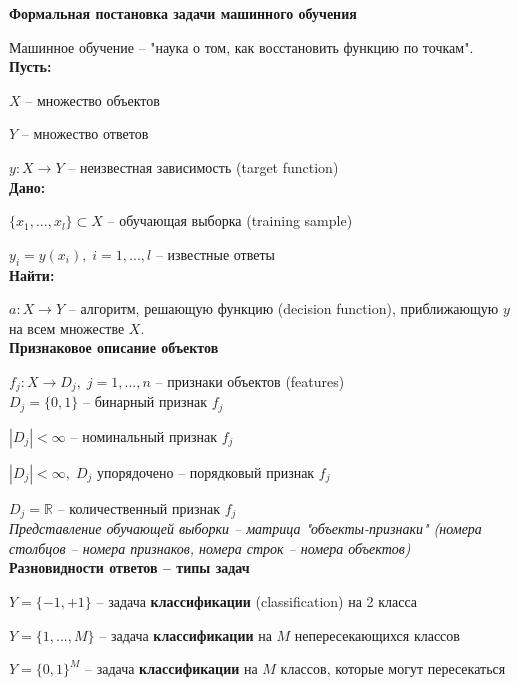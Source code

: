 \documentclass{article}
\begin{document}
    \huge{\textbf{Формальная постановка задачи машинного обучения}}\\\small
    
    Машинное обучение -- "наука о том, как восстановить функцию по точкам".\\
    
    \textbf{Пусть:}
    
    $X$ -- множество объектов
    
    $Y$ -- множество ответов
    
    $y: X\rightarrow Y$ -- неизвестная зависимость (target function)\\
    
    \textbf{Дано:}
    
    $\{x_1,...,x_l\}\subset X$ -- обучающая выборка (training sample)
    
    $y_i = y(x_i),\;i=1,...,l$ -- известные ответы\\
    
    \textbf{Найти:}
    
    $a: X\rightarrow Y$ -- алгоритм, решающую функцию (decision function), приближающую $y$ на всем множестве $X$.\\
    
    \textbf{Признаковое описание объектов}
    
    $f_j: X\rightarrow D_j,\;j=1,...,n$ -- признаки объектов (features)\\
    
    $D_j = \{0,1\}$ -- бинарный признак $f_j$
    
    $|D_j| < \infty$ -- номинальный признак $f_j$
    
    $|D_j| < \infty,\;D_j$ упорядочено -- порядковый признак $f_j$
    
    $D_j = \mathbb{R}$ -- количественный признак $f_j$\\
    
    \textit{Представление обучающей выборки -- матрица "объекты-признаки" (номера столбцов -- номера признаков, номера строк -- номера объектов)}\\

    \textbf{Разновидности ответов -- типы задач}
    
    $Y = \{-1,+1\}$ -- задача \textbf{классификации} (classification) на 2 класса
    
    $Y = \{1,...,M\}$ -- задача \textbf{классификации} на $M$ непересекающихся классов
    
    $Y = \{0,1\}^M$ -- задача \textbf{классификации} на $M$ классов, которые могут пересекаться
    
\end{document}
